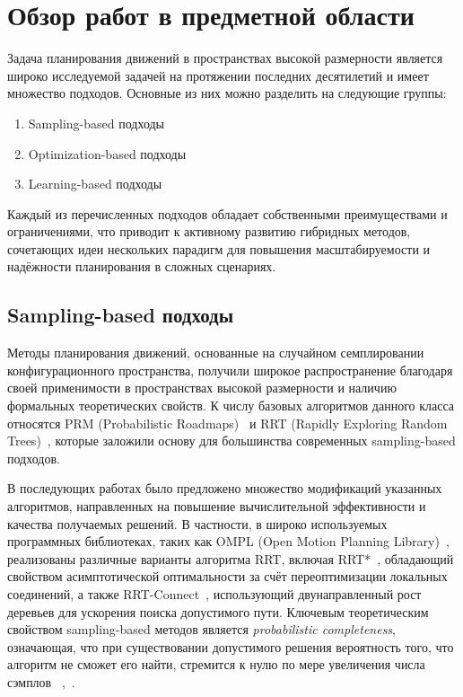 \documentclass[a4paper,12pt]{extarticle}
\begin{document}
\section{Обзор работ в предметной области}
Задача планирования движений в пространствах высокой размерности является широко исследуемой задачей на протяжении последних десятилетий и имеет множество подходов.
Основные из них можно разделить на следующие группы:
\begin{enumerate}
    \item Sampling-based подходы
    \item Optimization-based подходы
    \item Learning-based подходы
\end{enumerate}
Каждый из перечисленных подходов обладает собственными
преимуществами и ограничениями, что приводит к активному
развитию гибридных методов, сочетающих идеи нескольких парадигм для
повышения масштабируемости и надёжности планирования в сложных сценариях.

\subsection{Sampling-based подходы}
Методы планирования движений, основанные на случайном семплировании
конфигурационного пространства, получили широкое распространение
благодаря своей применимости в пространствах высокой размерности и
наличию формальных теоретических свойств. К числу базовых алгоритмов
данного класса относятся PRM (Probabilistic Roadmaps)~\cite{2} и RRT
(Rapidly Exploring Random Trees)~\cite{1}, которые заложили основу для большинства
современных sampling-based подходов.

В последующих работах было предложено множество модификаций указанных
алгоритмов, направленных на повышение вычислительной эффективности и
качества получаемых решений. В частности, в широко используемых
программных библиотеках, таких как OMPL (Open Motion Planning Library)~\cite{8},
реализованы различные варианты алгоритма RRT, включая RRT*~\cite{2}, обладающий
свойством асимптотической оптимальности за счёт переоптимизации
локальных соединений, а также RRT-Connect~\cite{9}, использующий двунаправленный
рост деревьев для ускорения поиска допустимого пути.
Ключевым теоретическим свойством sampling-based методов является
\emph{probabilistic completeness}, означающая, что при существовании
допустимого решения вероятность того, что алгоритм не сможет его найти,
стремится к нулю по мере увеличения числа сэмплов
~\cite{11},~\cite{12}.
\end{document}
